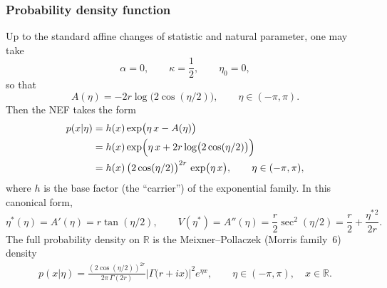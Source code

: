 \documentclass[a4paper,11pt]{article}
\numberwithin{equation}{section}
\theoremstyle{plain}
\theoremstyle{definition}
\theoremstyle{remark}
\newcommand{\1}{\ensuremath{\mathds{1}}\xspace}
\begin{document}
\subsubsection{Probability density function}
Up to the standard affine changes of statistic and natural parameter, one may take
\[
\alpha=0,\qquad \kappa=\frac12,\qquad \eta_0=0,
\]
so that
\[
A(\eta)=-2r\log\!\big(2\cos(\eta/2)\big),\qquad \eta\in(-\pi,\pi).
\]
Then the NEF takes the form
\begin{align}
p(x| \eta)
&=h(x)\exp\!\big(\eta\,x-A(\eta)\big)\notag\\
&=h(x)\exp\!\Big(\eta\,x+2r\log\!\big(2\cos(\eta/2)\big)\Big)\notag\\
&=h(x)\,\big(2\cos(\eta/2)\big)^{2r}\,\exp\!\big(\eta\,x\big),
\qquad \eta\in(-\pi,\pi),
\label{eq:pdf-ghs-cos}
\end{align}
where $h$ is the base factor (the ``carrier'') of the exponential family. In this canonical form,
\[
\eta^\ast(\eta)=A'(\eta)=r\tan(\eta/2),
\qquad
V(\eta^\ast)=A''(\eta)=\frac{r}{2}\sec^2(\eta/2)=\frac{r}{2}+\frac{\eta^\ast{}^2}{2r}.
\]
The full probability density on $\mathbb{R}$ is the
Meixner--Pollaczek (Morris family~6) density
\begin{align}
p(x| \eta)
=
\frac{(2\cos(\eta/2))^{2r}}{2\pi\,\Gamma(2r)}
\left|\Gamma\!\big(r+i x\big)\right|^2
e^{\eta x},
\qquad
\eta\in(-\pi,\pi),
\quad x\in\mathbb{R}.
\end{align}
\end{document}
